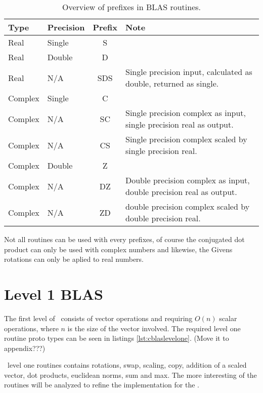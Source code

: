 \begin{table}
\begin{tabular}{|l|l|c|p{8cm}|}
\hline
\bf{Type} & \bf{Precision} & \bf{Prefix} & \bf{Note} \\
\hline
\hline
Real    & Single & S   & \\
\hline
Real    & Double & D   & \\
\hline
Real    & N/A    & SDS & Single precision input, calculated as double, returned as single.\\
\hline
Complex & Single & C   & \\
\hline
Complex & N/A    & SC  & Single precision complex as input, single precision real as output. \\
\hline
Complex & N/A    & CS  & Single precision complex scaled by single precision real. \\
\hline
Complex & Double & Z   & \\
\hline
Complex & N/A    & DZ  & Double precision complex as input, double precision real as output. \\
\hline
Complex & N/A    & ZD  & double precision complex scaled by double precision real. \\
\hline
\end{tabular}
\caption{Overview of prefixes in BLAS routines.\label{tbl:blaspre_overview}}
\end{table}

Not all routines can be used with every prefixes, of course the
conjugated dot product can only be used with complex numbers and
likewise, the Givens rotations can only be aplied to real numbers.

\section{Level 1 BLAS}

The first level of \BLAS\ consists of vector operations and requiring
$O(n)$ scalar operations, where $n$ is the size of the vector
involved. The required level one routine proto types can be seen in
listings \ref{lst:cblaslevelone}. (Move it to appendix???)

\BLAS\ level one routines contains rotations, swap, scaling, copy,
addition of a scaled vector, dot products, euclidean norms, sum and
max. The more interesting of the routines will be analyzed to refine
the implementation for the \CBE{}.





